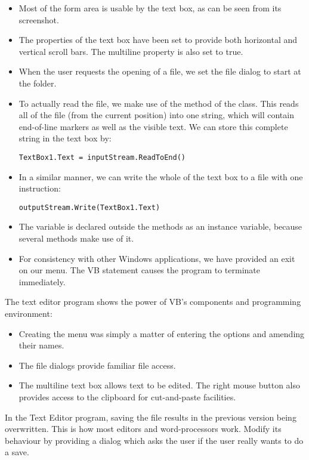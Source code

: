 		\begin{itemize}
      \item Most of the form area is usable by the text box, as can be seen from its screenshot.
      \item The properties of the text box have been set to provide both horizontal and vertical scroll bars. The multiline property is also set to true.
			\item When the user requests the opening of a file, we set the file dialog to start at the  folder.
      \item To actually read the file, we make use of the  method of the  class. This reads all of the file (from the current position) into one string, which will contain end-of-line markers as well as the visible text. We can store this complete string in the text box by:
				\begin{lstlisting}
TextBox1.Text = inputStream.ReadToEnd()
				\end{lstlisting}
      \item In a similar manner, we can write the whole of the text box to a file with one instruction:
				\begin{lstlisting}
outputStream.Write(TextBox1.Text)
				\end{lstlisting}
			\item The variable  is declared outside the methods as an instance variable, because several methods make use of it.
			\item For consistency with other Windows applications, we have provided an exit on our menu. The VB statement  causes the program to terminate immediately.
		\end{itemize}
		The text editor program shows the power of VB's components and programming environment:
		\begin{itemize}
      \item Creating the menu was simply a matter of entering the options and amending their names.
      \item The file dialogs provide familiar file access.
      \item The multiline text box allows text to be edited. The right mouse button also provides access to the clipboard for cut-and-paste facilities.
		\end{itemize}

		\begin{stqb}
			\begin{STQ}
				\item	In the Text Editor program, saving the file results in the previous version being overwritten. This is how most editors and word-processors work. Modify its behaviour by providing a dialog which asks the user if the user really wants to do a save.
			\end{STQ}
		\end{stqb}



